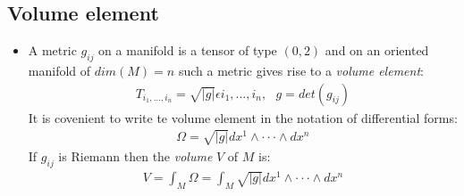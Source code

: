 \documentclass[11pt]{article}
\numberwithin{equation}{section}
\begin{document}
\subsection{Volume element}
\begin{itemize}
  \item A metric $g_{ij}$ on a manifold is a tensor of type $(0,2)$ and on an oriented manifold of $dim(M)=n$ such a metric gives rise to a \emph{volume element}: 
  \begin{align*}
    T_{i_1,\ldots,i_n} = \sqrt{|g|}\epsilon{i_1,\ldots,i_n},~~~g=det(g_{ij})
  \end{align*}
  It is covenient to write te volume element in the notation of differential forms:
  \begin{align*}
    \Omega = \sqrt{|g|}dx^{1}\wedge \cdot \cdot \cdot \wedge dx^{n}
  \end{align*}
  If $g_{ij}$ is Riemann then the \emph{volume} $V$ of $M$ is:
  \begin{align*}
    V = \int_M \Omega  = \int_{M}\sqrt{|g|}dx^{1}\wedge \cdot \cdot \cdot \wedge dx^{n}
  \end{align*}
\end{itemize}
\end{document}
